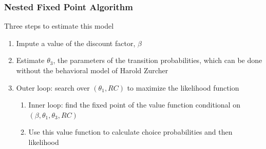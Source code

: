 \documentclass{beamer}
\begin{document}
\begin{frame}\frametitle{Nested Fixed Point Algorithm}
    Three steps to estimate this model
    \begin{enumerate}
    	\item Impute a value of the discount factor, $\beta$
    	\item Estimate $\theta_3$, the parameters of the transition probabilities, which can be done without the behavioral model of Harold Zurcher
    	\item Outer loop: search over $(\theta_1, RC)$ to maximize the likelihood function
    	\begin{enumerate}
    		\item Inner loop: find the fixed point of the value function conditional on $(\beta, \theta_1, \theta_3, RC)$
    		\item Use this value function to calculate choice probabilities and then likelihood
    	\end{enumerate}
    \end{enumerate}
\end{frame}
\end{document}
